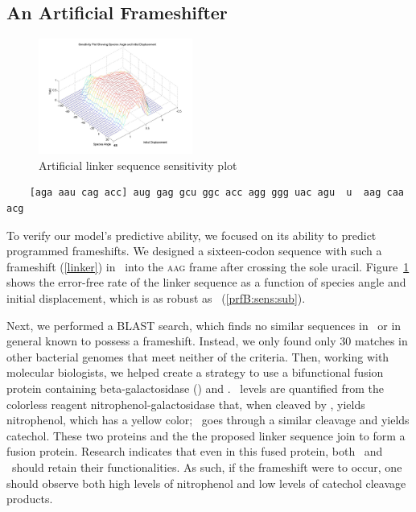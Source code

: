 \documentclass[12pt]{article}
\numberwithin{equation}{section}
\begin{document}
\subsection{An Artificial Frameshifter}
\begin{figure}
  \centering
  \caption{Artificial linker sequence sensitivity plot}
  \label{linker:sens}
  \includegraphics[width=0.45\textwidth]{linker/sensitivity}
\end{figure}

\begin{cfigure}
  \caption{Artificial linker sequence with a 12-base leader sequence
    in brackets}
  \label{linker}
  \begin{verbatim}
    [aga aau cag acc] aug gag gcu ggc acc agg ggg uac agu  u  aag caa acg
  \end{verbatim}
\end{cfigure}

To verify our model's predictive ability, we focused on its ability to
predict programmed frameshifts. We designed a sixteen-codon sequence
with such a frameshift (\autoref{linker}) in \ecoli\ into
the \textsc{aag} frame after crossing the sole uracil.  Figure~\ref{linker:sens}
shows the error-free rate of the linker sequence as a function of species
angle and initial displacement, which is as robust as \prfB\ (\autoref{prfB:sens:sub}).

Next, we performed a BLAST search, which finds no similar sequences in
\ecoli\ or in general known to possess a frameshift. Instead, we only found only 30
matches in other bacterial genomes that meet neither of the criteria.
Then, working with molecular biologists, we helped create a strategy
to use a bifunctional fusion protein containing beta-galactosidase (\bgals) 
and \xylE. \bgals\ levels are quantified from the colorless reagent 
nitrophenol-galactosidase that, when cleaved by \bgals, yields
nitrophenol, which has a yellow color; \xylE\ goes through a similar
cleavage and yields catechol.  These two proteins and the
the proposed linker sequence join to form a fusion protein.  Research indicates that even in this
fused protein, both \bgals\ and \xylE\ should retain their functionalities.
As such, if the frameshift were to occur, one should observe both 
high levels of nitrophenol and low levels of catechol cleavage products.
\end{document}

